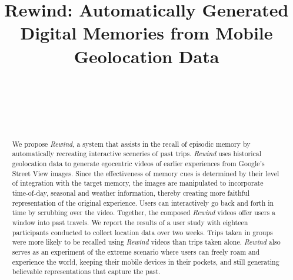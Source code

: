 \documentclass{sigchi}
\begin{document}
\title{Rewind: Automatically Generated\\Digital Memories from Mobile Geolocation Data}

\author{
  \alignauthor {~}\\
    \affaddr{~}\\
    \affaddr{~}\\
    \email{~}\\
}


\maketitle

\begin{abstract}
We propose \textit{Rewind}, a system that assists in the recall of episodic memory by automatically recreating interactive sceneries of past trips. \textit{Rewind} uses historical geolocation data to generate egocentric videos of earlier experiences from Google's Street View images. Since the effectiveness of memory cues is determined by their level of integration with the target memory, the images are manipulated to incorporate time-of-day, seasonal and weather information, thereby creating more faithful representation of the original experience. Users can interactively go back and forth in time by scrubbing over the video. Together, the composed \textit{Rewind} videos offer users a window into past travels. We report the results of a user study with eighteen participants conducted to collect location data over two weeks. Trips taken in groups were more likely to be recalled using \textit{Rewind} videos than trips taken alone. \textit{Rewind} also serves as an experiment of the extreme scenario where users can freely roam and experience the world, keeping their mobile devices in their pockets, and still generating believable representations that capture the past.
\end{abstract}
\end{document}
